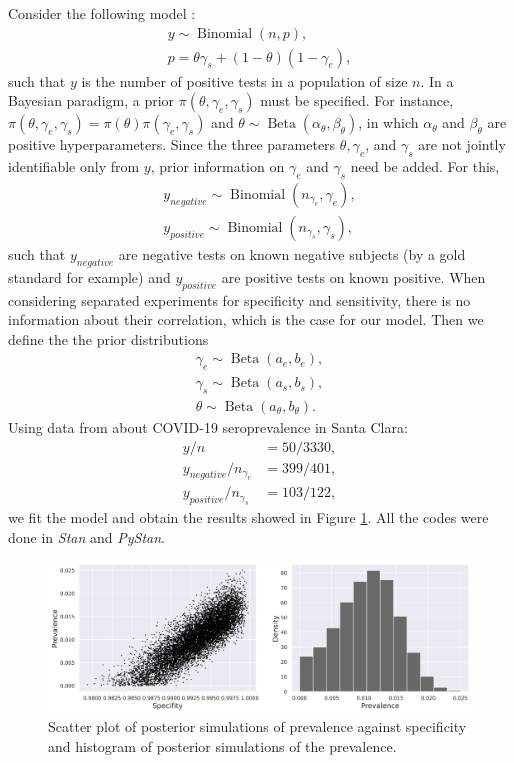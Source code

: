 Consider the following model \cite{gelman2020bayesian}:
\begin{gather*}
  y \sim \operatorname{Binomial}(n, p), \\
  p = \theta\gamma_s + (1- \theta)(1-\gamma_e), 
\end{gather*}
such that $y$ is the number of positive tests in a population of size $n$. In
a Bayesian paradigm, a prior $\pi(\theta, \gamma_e, \gamma_s)$ must be
specified. For instance, $\pi(\theta, \gamma_e, \gamma_s) =
\pi(\theta)\pi(\gamma_e, \gamma_s)$ and $\theta \sim
\operatorname{Beta}(\alpha_{\theta}, \beta_{\theta})$, in which
$\alpha_{\theta}$ and $\beta_{\theta}$ are positive hyperparameters. Since the
three parameters $\theta, \gamma_e$, and $\gamma_s$ are not jointly
identifiable only from $y$, prior information on $\gamma_e$ and $\gamma_s$
need be added. For this, 
\begin{gather*}
  y_{negative} \sim \operatorname{Binomial}(n_{\gamma_e}, \gamma_e), \\
  y_{positive} \sim \operatorname{Binomial}(n_{\gamma_s}, \gamma_s),
\end{gather*}
such that $y_{negative}$ are negative tests on known negative subjects
(by a gold standard for example) and $y_{positive}$ are positive tests on
known positive. When considering separated experiments for specificity and
sensitivity, there is
no information about their correlation, which is the case for our model. Then we define the the prior distributions
\begin{gather*}
  \gamma_e \sim \operatorname{Beta}(a_e, b_e), \\
  \gamma_s \sim \operatorname{Beta}(a_s, b_s), \\
  \theta \sim \operatorname{Beta}(a_{\theta}, b_{\theta}).
\end{gather*} 
Using data from \cite{bennett2020estimating} about COVID-19 seroprevalence in
Santa Clara:  
\begin{align*}
  y/n &= 50/3330,\\
y_{negative}/n_{\gamma_e} &= 399/401, \\
y_{positive}/n_{\gamma_s} &= 103/122, 
\end{align*}
we fit the model and obtain the results showed in Figure
\ref{fig:results-posterior-model1}. All the codes were done in {\em Stan} and
{\em PyStan}.

\begin{figure}[!ht]
  \centering
  \includegraphics[width=\textwidth]{../../images/model1_gelman_figure_english.png}
  \caption{Scatter plot of posterior simulations of prevalence against
  specificity and histogram of posterior simulations of the prevalence.}
  \label{fig:results-posterior-model1}
\end{figure}

